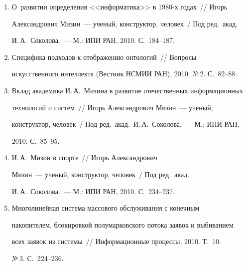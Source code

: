 \begin{enumerate}[1.]
Об основных направлениях деятельности Научно-обра\-зо\-ва\-тель\-но\-го центра 


по комплексной проблеме <<Информационное общество>> в вузе культуры 


и искусств~/\!\!/  Вестник Кемеровского государственного ун-та культуры и 


искусств, 2010. №\,13. С.~6--9.


\item {}


О~развитии определения <<информатика>> в 1980-х годах~/\!\!/  Игорь 


Александрович Мизин~--- ученый, конструктор, человек~/ Под ред.\ акад.\ 


И.\,А.~Соколова.~--- М.: ИПИ РАН, 2010. С.~184--187.


\item {}


Специфика подходов к отображению онтологий~/\!\!/  Вопросы 


искусственного интеллекта (Вестник НСМИИ РАН), 2010. №\,2. С.~82--88.


\item {}


Вклад академика И.\,А.~Мизина в развитие отечественных информационных 


технологий и сис\-тем~/\!\!/  Игорь Александрович Мизин~--- ученый, 


конструктор, человек~/ Под ред.\ акад.\ И.\,А.~Соколова.~--- М.: ИПИ РАН, 


2010. С.~85--95.


\item {} И.\,А.~Мизин в спорте~/\!\!/  Игорь Александрович 


Мизин~--- ученый, конструктор, человек~/ Под ред.\ акад.\ 


И.\,А.~Соколова.~--- М.: ИПИ РАН, 2010. С.~234--237.


\item {}


Многолинейная сис\-тема массового обслуживания с конечным 


накопителем, блокировкой полумарковского потока заявок и выбиванием 


всех заявок из сис\-темы~/\!\!/  Информационные процессы, 2010. Т.~10. 


№\,3. С.~224--236.


\end{enumerate}





